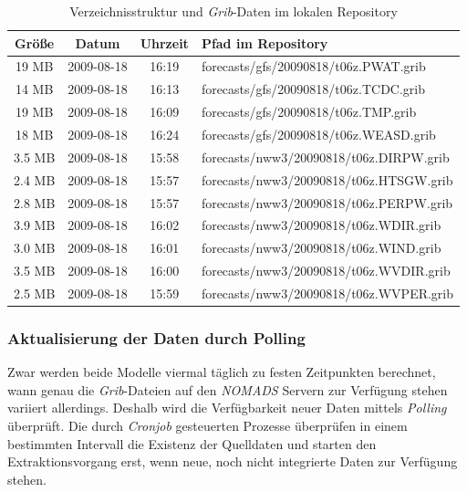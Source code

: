 \begin{table}
  \centering
  {\sf
    \footnotesize
    \begin{longtable}{@{}cccl}
      \toprule
      \textbf{Größe} & \textbf{Datum} & \textbf{Uhrzeit} & \textbf{Pfad im Repository} \\
      \midrule
      19 MB & 2009-08-18 & 16:19 & forecasts/gfs/20090818/t06z.PWAT.grib \\
      14 MB & 2009-08-18 & 16:13 & forecasts/gfs/20090818/t06z.TCDC.grib \\
      19 MB & 2009-08-18 & 16:09 & forecasts/gfs/20090818/t06z.TMP.grib \\
      18 MB & 2009-08-18 & 16:24 & forecasts/gfs/20090818/t06z.WEASD.grib \\
      \midrule
      3.5 MB & 2009-08-18 & 15:58 & forecasts/nww3/20090818/t06z.DIRPW.grib \\
      2.4 MB & 2009-08-18 & 15:57 & forecasts/nww3/20090818/t06z.HTSGW.grib \\
      2.8 MB & 2009-08-18 & 15:57 & forecasts/nww3/20090818/t06z.PERPW.grib \\
      3.9 MB & 2009-08-18 & 16:02 & forecasts/nww3/20090818/t06z.WDIR.grib \\
      3.0 MB & 2009-08-18 & 16:01 & forecasts/nww3/20090818/t06z.WIND.grib \\
      3.5 MB & 2009-08-18 & 16:00 & forecasts/nww3/20090818/t06z.WVDIR.grib \\
      2.5 MB & 2009-08-18 & 15:59 & forecasts/nww3/20090818/t06z.WVPER.grib \\
      \bottomrule
    \end{longtable}
  }
  \caption{Verzeichnisstruktur und \textit{Grib}-Daten im lokalen Repository}
  \label{tab:repository}
\end{table}

\subsubsection{Aktualisierung der Daten durch Polling}
Zwar werden beide Modelle viermal täglich zu festen Zeitpunkten
berechnet, wann genau die \textit{Grib}-Dateien auf den
\textit{NOMADS} Servern zur Verfügung stehen variiert
allerdings. Deshalb wird die Verfügbarkeit neuer Daten mittels
\textit{Polling} überprüft. Die durch \textit{Cronjob} gesteuerten
Prozesse überprüfen in einem bestimmten Intervall die Existenz der
Quelldaten und starten den Extraktionsvorgang erst, wenn neue, noch
nicht integrierte Daten zur Verfügung stehen.

